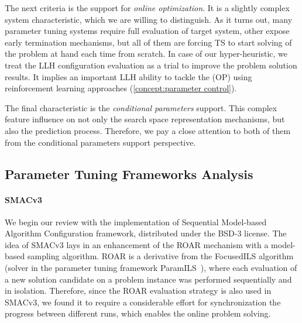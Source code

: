 The next criteria is the support for \emph{online optimization}. It is a slightly complex system characteristic, which we are willing to distinguish. As it turns out, many parameter tuning systems require full evaluation of target system, other expose early termination mechanisms, but all of them are forcing TS to start solving of the problem at hand each time from scratch. In case of our hyper-heuristic, we treat the LLH configuration evaluation as a trial to improve the problem solution results. It implies an important LLH ability to tackle the (OP) using reinforcement learning approaches (\cref{concept:parameter control}).

The final characteristic is the \emph{conditional parameters} support. This complex feature influence on not only the search space representation mechanisms, but also the prediction process. Therefore, we pay a close attention to both of them from the conditional parameters support perspective.

\subsection{Parameter Tuning Frameworks Analysis}\label{impl: Parameter Tuning Frameworks Analysis}
\paragraph{SMACv3}
We begin our review with the implementation of Sequential Model-based Algorithm Configuration framework, distributed under the BSD-3 license. The idea of SMACv3 lays in an enhancement of the ROAR mechanism with a model-based sampling algorithm. ROAR is a derivative from the FocusedILS algorithm (solver in the parameter tuning framework ParamILS~\cite{hutter2009paramils}), where each evaluation of a new solution candidate on a problem instance was performed sequentially and in isolation. Therefore, since the ROAR evaluation strategy is also used in SMACv3, we found it to require a considerable effort for synchronization the progress between different runs, which enables the online problem solving.


